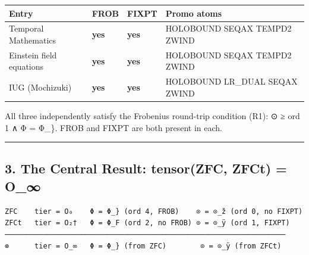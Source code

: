 {\def\LTcaptype{none} %
\begin{longtable}[]{@{}
  >{\raggedright\arraybackslash}p{}
  >{\raggedright\arraybackslash}p{}
  >{\raggedright\arraybackslash}p{}
  >{\raggedright\arraybackslash}p{}@{}}
\toprule\noalign{}
\begin{minipage}[b]{\linewidth}\raggedright
Entry
\end{minipage} & \begin{minipage}[b]{\linewidth}\raggedright
FROB
\end{minipage} & \begin{minipage}[b]{\linewidth}\raggedright
FIXPT
\end{minipage} & \begin{minipage}[b]{\linewidth}\raggedright
Promo atoms
\end{minipage} \\
\midrule\noalign{}
\endhead
\bottomrule\noalign{}
\endlastfoot
Temporal Mathematics & \textbf{yes} & \textbf{yes} & HOLOBOUND SEQAX
TEMPD2 ZWIND \\
Einstein field equations & \textbf{yes} & \textbf{yes} & HOLOBOUND SEQAX
TEMPD2 ZWIND \\
IUG (Mochizuki) & \textbf{yes} & \textbf{yes} & HOLOBOUND LR\_DUAL SEQAX
ZWIND \\
\end{longtable}
}

All three independently satisfy the Frobenius round-trip condition (R1):
⊙ ≥ ord 1 ∧ Φ = Φ\_\}. FROB and FIXPT are both present in each.

\begin{center}\rule{0.5\linewidth}{0.5pt}\end{center}

\subsection{3. The Central Result: tensor(ZFC, ZFCt) =
O\_∞}\label{the-central-result-tensorzfc-zfct-o_}

\begin{verbatim}
ZFC    tier = O₀    Φ = Φ_} (ord 4, FROB)    ⊙ = ⊙_ž (ord 0, no FIXPT)
ZFCt   tier = O₂†   Φ = Φ_F (ord 2, no FROB) ⊙ = ⊙_ÿ (ord 1, FIXPT)
──────────────────────────────────────────────────────────────────
⊗      tier = O_∞   Φ = Φ_} (from ZFC)        ⊙ = ⊙_ÿ (from ZFCt)
\end{verbatim}

